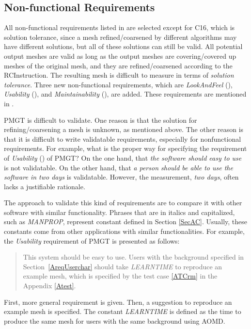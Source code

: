 \documentclass[12pt,titlepage]{article}
\begin{document}
\subsection{Non-functional Requirements \label{nonFunReq}}
All non-functional requirements listed in \citet{Smith2004} are selected except for C16, which is solution tolerance, since a mesh refined/coarsened by different algorithms may have different solutions, but all of these solutions can still be valid. All potential output meshes are valid as long as the output meshes are covering/covered up meshes of the original mesh, and they are refined/coarsened according to the RCInstruction. The resulting mesh is difficult to measure in terms of \emph{solution tolerance}. Three new non-functional requirements, which are \emph{LookAndFeel} (), \emph{Usability} (), and \emph{Maintainability} (), are added. These requirements are mentioned in \citet{Lai2004}. 

PMGT is difficult to validate. One reason is that the solution for refining/coarsening a mesh is unknown, as mentioned above. The other reason is that it is difficult to write validatable requirements, especially for nonfunctional requirements. For example, what is the proper way for specifying the requirement of \emph{Usability} () of PMGT? On the one hand, that \emph{the software should easy to use} is not validatable. On the other hand, that \emph{a person should be able to use the software in two days} is validatable. However, the measurement, \emph{two days}, often lacks a justifiable rationale. 

The approach to validate this kind of requirements are to compare it with other software with similar functionality. Phrases that are in italics and capitalized, such as \emph{MANPROP}, represent constant defined in Section \ref{SecAC}. Usually, these constants come from other applications with similar functionalities. For example, the \emph{Usability} requirement of PMGT is presented as follows:
\begin{quotation}
This system should be easy to use. Users with the background specified in Section~\ref{AreqUserchar} should take \emph{LEARNTIME} to reproduce an example mesh, which is specified by the test case \cref{ATCrm} in the Appendix \ref{Atest}.
\end{quotation}
First, more general requirement is given. Then, a suggestion to reproduce an example mesh is specified. The constant \emph{LEARNTIME} is defined as the time to produce the same mesh for users with the same background using AOMD. 
\end{document}
